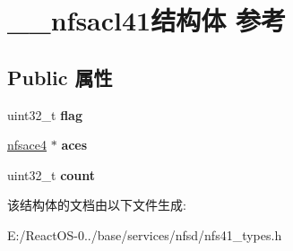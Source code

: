 \hypertarget{struct____nfsacl41}{}\section{\+\_\+\+\_\+nfsacl41结构体 参考}
\label{struct____nfsacl41}
\subsection*{Public 属性}
\begin{DoxyCompactItemize}
\item 
\mbox{\label{struct____nfsacl41_ac8cad0d1f88d195b1353865a6bfa29b0}} 
uint32\+\_\+t {\bfseries flag}
\item 
\mbox{\label{struct____nfsacl41_a17176ee2da8239781ddfd2f184eaa9b2}} 
\hyperlink{struct____nfsace4}{nfsace4} $\ast$ {\bfseries aces}
\item 
\mbox{\label{struct____nfsacl41_a8ea75f8882961c1a120aa1b1fb19a326}} 
uint32\+\_\+t {\bfseries count}
\end{DoxyCompactItemize}


该结构体的文档由以下文件生成\+:\begin{DoxyCompactItemize}
\item 
E\+:/\+React\+O\+S-\/0../base/services/nfsd/nfs41\+\_\+types.\+h\end{DoxyCompactItemize}
